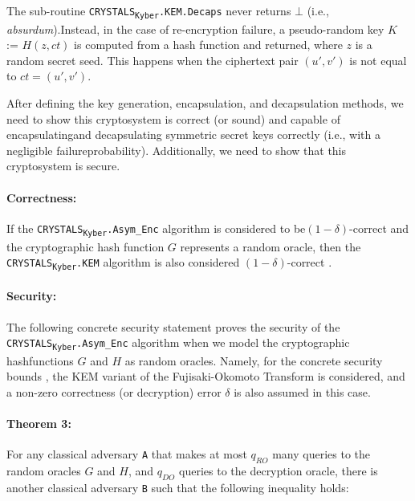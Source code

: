\documentclass[runningheads]{llncs}
\numberwithin{equation}{section}
\begin{document}
    \noindent The sub-routine \texorpdfstring{\texttt{CRYSTALS}\textsubscript{\texttt{Kyber}}\texttt{.KEM}\texttt{.Decaps}}\/ never returns $\bot$ (i.e., \textit{absurdum}).\break Instead, in the case of re-encryption failure, a pseudo-random key $K$ := $H(z, ct)$ is computed from a hash function and returned, where $z$ is a random secret seed. This happens when the ciphertext pair $(u',v')$ is not equal to $ct = (u',v')$.

    \vspace{2ex}

    \noindent After defining the key generation, encapsulation, and decapsulation methods, we need to show this cryptosystem is correct (or sound) and capable of encapsulating\break and decapsulating symmetric secret keys correctly (i.e., with a negligible failure\break probability). Additionally, we need to show that this cryptosystem is secure.
    
    \paragraph{\textbf{Correctness:}} If the \texorpdfstring{\texttt{CRYSTALS}\textsubscript{\texttt{Kyber}}\texttt{.Asym\_Enc}}\/ algorithm is considered to be\break $( 1 - \delta )$-correct and the cryptographic hash function $G$ represents a random oracle, then the \texorpdfstring{\texttt{CRYSTALS}\textsubscript{\texttt{Kyber}}\texttt{.KEM}}\/ algorithm is also considered $( 1 - \delta )$-correct \cite{hofheinz-hovelmanns-kiltz:modular-analysis-fujisaki-okamoto-transformation:2017:06-2024}.
    
    \paragraph{\textbf{Security:}} The following concrete security statement proves the security of the \texorpdfstring{\texttt{CRYSTALS}\textsubscript{\texttt{Kyber}}\texttt{.Asym\_Enc}}\/ algorithm when we model the cryptographic hash\break functions $G$ and $H$ as random oracles. Namely, for the concrete security bounds \cite{hofheinz-hovelmanns-kiltz:modular-analysis-fujisaki-okamoto-transformation:2017:06-2024}, the KEM variant of the Fujisaki-Okomoto Transform \cite{fujisaki-okamoto:secure-integration-asymmetric-and-symmetric-encryption-schemes:2013:06-2024} is considered, and a non-zero correctness (or decryption) error $\delta$ is also assumed in this case.

    \paragraph{\textbf{Theorem 3:}} For any classical adversary \texttt{A} that makes at most ${q}_{RO}$ many queries to the random oracles $G$ and $H$, and ${q}_{DO}$ queries to the decryption oracle, there is another classical adversary \texttt{B} such that the following inequality holds:
\end{document}
